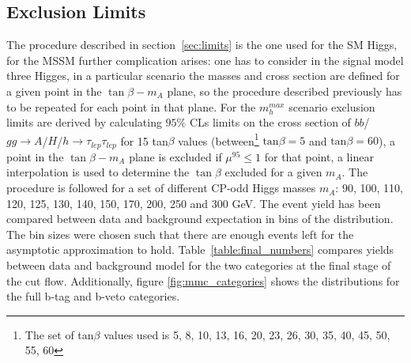 \subsection{Exclusion Limits}
The procedure described in section~\ref{sec:limits} is  the one used for the SM Higgs, for the MSSM further complication
arises: one has to consider in the signal 
model three Higges, in a particular scenario the masses and cross section are defined for a given point in the $\tan \beta - m_A$
plane, so the procedure described previously has to be repeated for each point in that plane. 
For the $m_h^{max}$ scenario exclusion limits are derived by calculating $95\%$ CLs limits on the cross section of
$bb$/$gg\to A$/$H$/$h\to\tau_{lep}\tau_{lep}$ for 15 tan$\beta$ values (between\footnote{The set of  tan$\beta$ values used
is 5, 8, 10, 13, 16, 20, 23, 26, 30, 35, 40, 45, 50, 55, 60}  $\mathrm{tan}\beta=5$ and $\mathrm{tan}\beta=60$),
a point in the  $\tan \beta - m_A$ plane is excluded if $\mu^{95} \leq 1$ for that point, 
a linear interpolation is used to determine the $\tan \beta$ excluded for a given $m_A$.
The procedure is followed for a set of different CP-odd Higgs masses $m_A$: 90, 100, 110, 120, 125, 130,
140, 150, 170, 200, 250 and 300 GeV.
The event yield has been compared between data and background expectation in bins of the \mmc distribution. The bin sizes were chosen
such that there are enough events left for the asymptotic approximation \cite{CCGV} to  hold.
Table~\ref{table:final_numbers} compares yields between data and background model for the two categories at the final
stage of the cut flow. Additionally, figure \ref{fig:mmc_categories} shows the \mmc distributions for the full b-tag and b-veto categories. 


